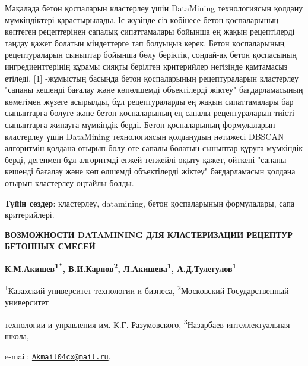 Мақалада бетон қоспаларын кластерлеу үшін DataMining технологиясын
қолдану мүмкіндіктері қарастырылады. Іс жүзінде сіз көбінесе бетон
қоспаларының көптеген рецептерінен сапалық сипаттамалары бойынша ең
жақын рецептілерді таңдау қажет болатын міндеттерге тап болуыңыз керек.
Бетон қоспаларының рецептураларын сыныптар бойынша бөлу беріктік,
сондай-ақ бетон қоспасының ингредиенттерінің құрамы сияқты берілген
критерийлер негізінде қамтамасыз етіледі. {[}1{]} -жұмыстың басында
бетон қоспаларының рецептураларын кластерлеу "сапаны кешенді бағалау
және көпөлшемді объектілерді жіктеу" бағдарламасының көмегімен жүзеге
асырылды, бұл рецептураларды ең жақын сипаттамалары бар сыныптарға
бөлуге және бетон қоспаларының ең сапалы рецептураларын тиісті
сыныптарға жинауға мүмкіндік берді. Бетон қоспаларының формулаларын
кластерлеу үшін DataMining технологиясын қолданудың нәтижесі DBSCAN
алгоритмін қолдана отырып бөлу өте сапалы болатын сыныптар құруға
мүмкіндік берді, дегенмен бұл алгоритмді егжей-тегжейлі оқыту қажет,
өйткені "сапаны кешенді бағалау және көп өлшемді объектілерді жіктеу"
бағдарламасын қолдана отырып кластерлеу оңтайлы болды.

{\bfseries Түйін сөздер}: кластерлеу, datamining, бетон қоспаларының
формулалары, сапа критерийлері.

\begin{center}
{\large\bfseries ВОЗМОЖНОСТИ DATAMINING ДЛЯ КЛАСТЕРИЗАЦИИ РЕЦЕПТУР БЕТОННЫХ
СМЕСЕЙ}

{\bfseries К.М.Акишев\textsuperscript{1*}, В.И.Карпов\textsuperscript{2},
Л.Акишева\textsuperscript{1}, А.Д.Тулегулов\textsuperscript{1}}

\textsuperscript{1}Казахский университет технологии и бизнеса,
\textsuperscript{2}Московский Государственный университет

технологии и управления им. К.Г. Разумовского,
\textsuperscript{3}Назарбаев интеллектуальная школа,

e-mail:
\href{mailto:Akmail04cx@mail.ru}{\nolinkurl{Akmail04cx@mail.ru}},
\end{center}

